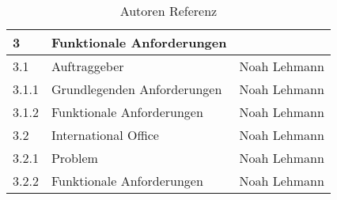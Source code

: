 \begin{table}[H]
\begin{center}
\begin{tabular}{| l | l | l |}
\hline    
\rowcolor{LGray} 						
\textbf{3}	& \textbf{Funktionale Anforderungen} &  				\\
\hline
3.1		& Auftraggeber					& Noah Lehmann	\\
\hline
3.1.1	& Grundlegenden Anforderungen	& Noah Lehmann	\\
\hline
3.1.2	& Funktionale Anforderungen		& Noah Lehmann	\\
\hline
3.2		& International Office			& Noah Lehmann	\\
\hline
3.2.1	& Problem						& Noah Lehmann	\\
\hline
3.2.2	& Funktionale Anforderungen		& Noah Lehmann	\\


\hline
  \end{tabular}
  \end{center}
\caption[Autoren Referenz]{Autoren Referenz}
\label{tab:autoren}
\end{table}

\newpage

